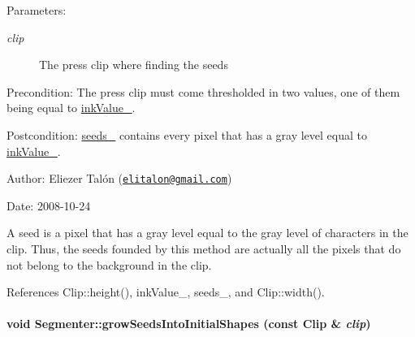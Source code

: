 \begin{Desc}
\item[Parameters:]
\begin{description}
\item[{\em clip}]The press clip where finding the seeds\end{description}
\end{Desc}
\begin{Desc}
\item[Precondition:]The press clip must come thresholded in two values, one of them being equal to \hyperlink{class_segmenter_fa6183f99aa6011399783652b341a43b}{inkValue\_\-}.\end{Desc}
\begin{Desc}
\item[Postcondition:]\hyperlink{class_segmenter_7859d050250b9fdf7c96374f80008d6e}{seeds\_\-} contains every pixel that has a gray level equal to \hyperlink{class_segmenter_fa6183f99aa6011399783652b341a43b}{inkValue\_\-}.\end{Desc}
\begin{Desc}
\item[Author:]Eliezer Talón (\href{mailto:elitalon@gmail.com}{\tt elitalon@gmail.com}) \end{Desc}
\begin{Desc}
\item[Date:]2008-10-24\end{Desc}
A seed is a pixel that has a gray level equal to the gray level of characters in the clip. Thus, the seeds founded by this method are actually all the pixels that do not belong to the background in the clip. 

References Clip::height(), inkValue\_\-, seeds\_\-, and Clip::width().\hypertarget{class_segmenter_72c007e345fad7abbf6e9d4edb615a50}{
\paragraph[growSeedsIntoInitialShapes]{\setlength{\rightskip}{0pt plus 5cm}void Segmenter::growSeedsIntoInitialShapes (const {\bf Clip} \& {\em clip})}\hfill}
\label{class_segmenter_72c007e345fad7abbf6e9d4edb615a50}


